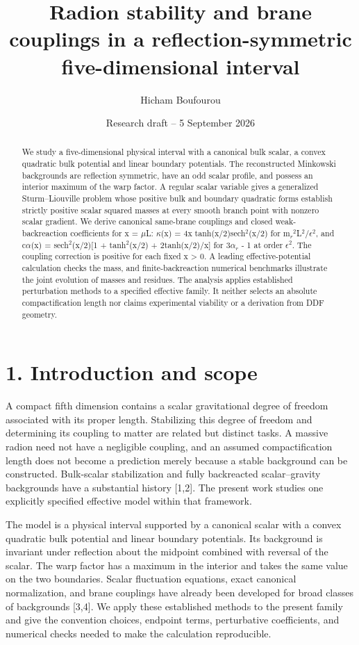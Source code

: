 \documentclass[11pt]{article}
\title{Radion stability and brane couplings in a reflection-symmetric five-dimensional interval}
\author{Hicham Boufourou}
\date{Research draft -- 5 September 2026}
\begin{document}
\maketitle
\begin{abstract}
We study a five-dimensional physical interval with a canonical bulk scalar, a convex quadratic bulk potential and linear boundary potentials. The reconstructed Minkowski backgrounds are reflection symmetric, have an odd scalar profile, and possess an interior maximum of the warp factor. A regular scalar variable gives a generalized Sturm--Liouville problem whose positive bulk and boundary quadratic forms establish strictly positive scalar squared masses at every smooth branch point with nonzero scalar gradient. We derive canonical same-brane couplings and closed weak-backreaction coefficients for x = \(\mu\)L: \(\kappa\)(x) = 4x tanh(x/2)sech\({}^2\)(x/2) for m\({}_r\)\({}^2\)L\({}^2\)/\(\epsilon\)\({}^2\), and c\(\alpha\)(x) = sech\({}^2\)(x/2)[1 + tanh\({}^2\)(x/2) + 2tanh(x/2)/x] for 3\(\alpha\)\({}_r\) - 1 at order \(\epsilon\)\({}^2\). The coupling correction is positive for each fixed x > 0. A leading effective-potential calculation checks the mass, and finite-backreaction numerical benchmarks illustrate the joint evolution of masses and residues. The analysis applies established perturbation methods to a specified effective family. It neither selects an absolute compactification length nor claims experimental viability or a derivation from DDF geometry.
\end{abstract}
\section*{1. Introduction and scope}
A compact fifth dimension contains a scalar gravitational degree of freedom associated with its proper length. Stabilizing this degree of freedom and determining its coupling to matter are related but distinct tasks. A massive radion need not have a negligible coupling, and an assumed compactification length does not become a prediction merely because a stable background can be constructed. Bulk-scalar stabilization and fully backreacted scalar--gravity backgrounds have a substantial history [1,2]. The present work studies one explicitly specified effective model within that framework.

The model is a physical interval supported by a canonical scalar with a convex quadratic bulk potential and linear boundary potentials. Its background is invariant under reflection about the midpoint combined with reversal of the scalar. The warp factor has a maximum in the interior and takes the same value on the two boundaries. Scalar fluctuation equations, exact canonical normalization, and brane couplings have already been developed for broad classes of backgrounds [3,4]. We apply these established methods to the present family and give the convention choices, endpoint terms, perturbative coefficients, and numerical checks needed to make the calculation reproducible.
\end{document}

